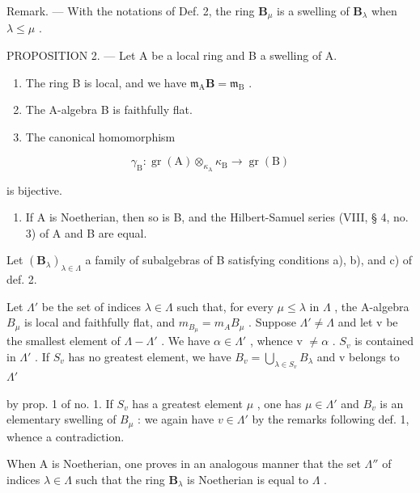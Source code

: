 Remark. --- With the notations of Def. 2, the ring \(\mathbf{B}_{\mu}\) is a swelling of \(\mathbf{B}_{\lambda}\) when \(\lambda \leqslant \mu\) .

PROPOSITION 2. --- Let A be a local ring and B a swelling of A.

\begin{enumerate}
\def\labelenumi{\alph{enumi})}
\item
  The ring B is local, and we have \(\mathfrak{m}_{\mathrm{A}}\mathbf{B} = \mathfrak{m}_{\mathrm{B}}\) .
\item
  The A-algebra B is faithfully flat.
\item
  The canonical homomorphism
\end{enumerate}

\[
\gamma_ {\mathrm{B}}: \operatorname{gr} (\mathrm{A}) \otimes_ {\kappa_ {\mathrm{A}}} \kappa_ {\mathrm{B}} \rightarrow \operatorname{gr} (\mathrm{B})
\]

is bijective.

\begin{enumerate}
\def\labelenumi{\alph{enumi})}
\setcounter{enumi}{3}
\tightlist
\item
  If A is Noetherian, then so is B, and the Hilbert-Samuel series (VIII, § 4, no. 3) of A and B are equal.
\end{enumerate}

Let \((\mathbf{B}_{\lambda})_{\lambda\in\Lambda}\) a family of subalgebras of B satisfying conditions a), b), and c) of def. 2.

Let \(\Lambda'\) be the set of indices \(\lambda \in \Lambda\) such that, for every \(\mu \leqslant \lambda\) in \(\Lambda\) , the A-algebra \(B_{\mu}\) is local and faithfully flat, and \(m_{B_{\mu}} = m_A B_{\mu}\) . Suppose \(\Lambda' \neq \Lambda\) and let v be the smallest element of \(\Lambda - \Lambda'\) . We have \(\alpha \in \Lambda'\) , whence v \(\neq \alpha\) . \(S_{v}\) is contained in \(\Lambda'\) . If \(S_{v}\) has no greatest element, we have \(B_{v} = \bigcup_{\lambda \in S_{v}} B_{\lambda}\) and v belongs to \(\Lambda'\)

  by prop. 1 of no. 1. If \(S_v\) has a greatest element \(\mu\) , one has \(\mu \in \Lambda'\) and \(B_v\) is an elementary swelling of \(B_\mu\) : we again have \(v \in \Lambda'\) by the remarks following def. 1, whence a contradiction.

When A is Noetherian, one proves in an analogous manner that the set \(\Lambda''\) of indices \(\lambda \in \Lambda\) such that the ring \(\mathbf{B}_{\lambda}\) is Noetherian is equal to \(\Lambda\) .

